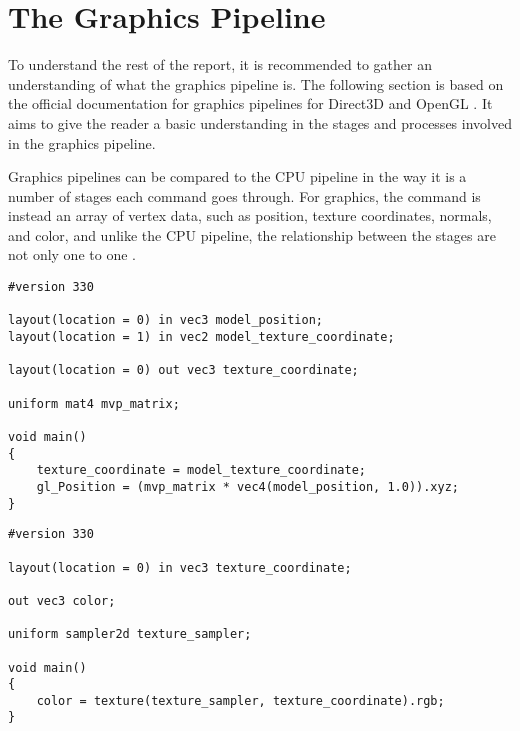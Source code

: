 \section{The Graphics Pipeline} \label{sec:pipeline} 
\begin{sectionmeta}
To understand the rest of the report, it is recommended to gather an understanding of what the graphics pipeline is.
The following section is based on the official documentation for graphics pipelines for Direct3D and OpenGL \cite{khronos????pipeline, microsoft????pipeline}.
It aims to give the reader a basic understanding in the stages and processes involved in the graphics pipeline.
\end{sectionmeta}

Graphics pipelines can be compared to the \gls{CPU} pipeline in the way it is a number of stages each command goes through.
For graphics, the command is instead an array of vertex data, such as position, texture coordinates, normals, and color, and unlike the \gls{CPU} pipeline, the relationship between the stages are not only one to one .


\begin{lstlisting}
#version 330

layout(location = 0) in vec3 model_position;
layout(location = 1) in vec2 model_texture_coordinate;

layout(location = 0) out vec3 texture_coordinate;

uniform mat4 mvp_matrix;

void main()
{
    texture_coordinate = model_texture_coordinate;
    gl_Position = (mvp_matrix * vec4(model_position, 1.0)).xyz;
}
\end{lstlisting}

\begin{lstlisting}
#version 330

layout(location = 0) in vec3 texture_coordinate;

out vec3 color;

uniform sampler2d texture_sampler;

void main()
{
    color = texture(texture_sampler, texture_coordinate).rgb;
}
\end{lstlisting}

